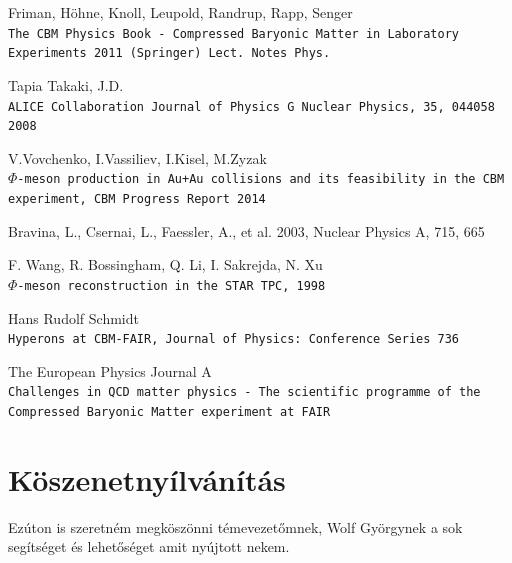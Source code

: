 \documentclass[a4paper,12pt]{article}
\begin{document}
\begin{thebibliography}{9}
	Friman, Höhne, Knoll, Leupold, Randrup, Rapp, Senger
	\\\texttt{The CBM Physics Book - Compressed Baryonic Matter in Laboratory Experiments 2011 (Springer) Lect. Notes Phys.}
				
	 Tapia Takaki, J.D.
	 \\\texttt{ALICE Collaboration Journal of Physics G Nuclear Physics, 35, 044058 2008}
				
	 V.Vovchenko, I.Vassiliev, I.Kisel, M.Zyzak
	 \\\texttt{$\Phi$-meson production in Au+Au collisions and its feasibility in the CBM experiment, CBM Progress Report 2014}
				
	Bravina, L., Csernai, L., Faessler, A., et al. 2003, Nuclear Physics A, 715, 665 
				
	F. Wang, R. Bossingham, Q. Li, I. Sakrejda,  N. Xu 
	\\\texttt{$\Phi$-meson reconstruction in the STAR TPC, 1998}
				
	Hans Rudolf Schmidt
	\\\texttt{Hyperons at CBM-FAIR, Journal of Physics: Conference Series 736}
	
	The European Physics Journal A
	\\\texttt{Challenges in QCD matter physics - The scientific programme of the Compressed Baryonic Matter experiment at FAIR}
\end{thebibliography}
\newpage
\section{Köszenetnyílvánítás}
Ezúton is szeretném megköszönni témevezetőmnek, Wolf Györgynek a sok segítséget és lehetőséget amit nyújtott nekem. 
\end{document}
